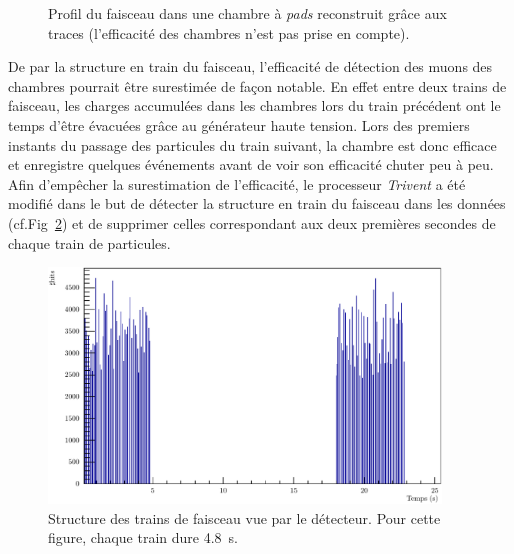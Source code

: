 \begin{figure}[ht!]
	\centering
	\hfill
	\caption{Profil du faisceau dans une chambre à \textit{pads} reconstruit grâce aux traces (l’efficacité des chambres n’est pas prise en compte).}
	\label{ProfilFaisceauSPS}
\end{figure}

De par la structure en train du faisceau, l'efficacité de détection des muons des chambres pourrait être surestimée de façon notable. En effet entre deux trains de faisceau, les charges accumulées dans les chambres lors du train précédent ont le temps d'être évacuées grâce au générateur haute tension. Lors des premiers instants du passage des particules du train suivant, la chambre est donc efficace et enregistre quelques événements avant de voir son efficacité chuter peu à peu. Afin d'empêcher la surestimation de l'efficacité, le processeur \textit{Trivent} a été modifié dans le but de détecter la structure en train du faisceau dans les données (cf.Fig~\ref{StructureSpill}) et de supprimer celles correspondant aux deux premières secondes de chaque train de particules.
\vspace*{0.4cm}
\begin{figure}[!ht]
	\centering
	\includegraphics[width=0.93\textwidth]{GLA/SpillStructure.pdf}
	\caption{Structure des trains de faisceau vue par le détecteur. Pour cette figure, chaque train dure \SI{4.8}{\second}.}
	\label{StructureSpill}
\end{figure}

